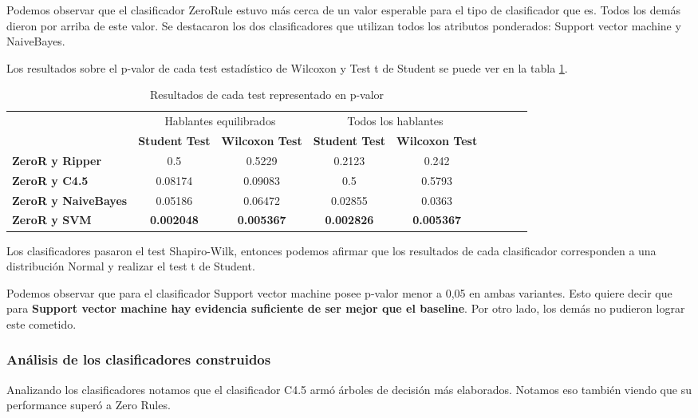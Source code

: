 Podemos observar que el clasificador ZeroRule estuvo más cerca de un valor esperable para el tipo de clasificador que es. Todos los demás dieron por arriba de este valor. Se destacaron los dos clasificadores que utilizan todos los atributos ponderados: Support vector machine y NaiveBayes.

Los resultados sobre el p-valor de cada test estadístico de Wilcoxon y Test t de Student se puede ver en la tabla \ref{PAH_res_tests_wilcoxon_student}.

\begin{table}[H]
	\centering
	\footnotesize 
	\begin{tabular}{|l|c|c|c|c|c|c|c|c|}
		\hline
		\multirow{2}{*}{ }  & \multicolumn{2}{c|}{Hablantes equilibrados } & \multicolumn{2}{|c|}{Todos los hablantes} \\ \cline{2-5}
		& \textbf{Student Test} & \textbf{Wilcoxon Test} & \textbf{Student Test} & \textbf{Wilcoxon Test} \\ \hline		
			\textbf{ZeroR y Ripper} & 0.5 & 0.5229 & 0.2123 & 0.242 \\ \hline
			\textbf{ZeroR y C4.5} & 0.08174 & 0.09083 & 0.5 & 0.5793 \\ \hline
			\textbf{ZeroR y NaiveBayes} & 0.05186 & 0.06472 & 0.02855 & 0.0363 \\ \hline
			\textbf{ZeroR y SVM} & \textbf{0.002048} & \textbf{0.005367} & \textbf{0.002826} & \textbf{0.005367} \\ \hline
	\end{tabular}
	\caption{Resultados de cada test representado en p-valor}
	\label{PAH_res_tests_wilcoxon_student}
\end{table}

Los clasificadores pasaron el test Shapiro-Wilk, entonces podemos afirmar que los resultados de cada clasificador corresponden a una distribución Normal y realizar el test t de Student.

Podemos observar que para el clasificador Support vector machine posee p-valor menor a 0,05 en ambas variantes. Esto quiere decir que para \textbf{Support vector machine hay evidencia suficiente de ser mejor que el baseline}. Por otro lado, los demás no pudieron lograr este cometido. 

\subsubsection{Análisis de los clasificadores construidos}

Analizando los clasificadores notamos que el clasificador C4.5 armó árboles de decisión más elaborados. Notamos eso también viendo que su performance superó a Zero Rules. 

